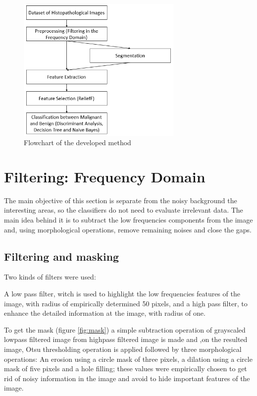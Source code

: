 \documentclass[conference]{IEEEtran}
\begin{document}
\begin{figure}[h]
    \centering
    \includegraphics[width=8cm]{images/imagem3.png}
    \caption{Flowchart of the developed method}
    \label{fig:my_label}
\end{figure}

\section{Filtering: Frequency Domain}
The main objective of this section is separate from the noisy background the interesting areas, so the classifiers do not need to evaluate irrelevant data.
The main idea behind it is to subtract the low frequencies components from the image and, using morphological operations, remove remaining noises and close the gaps.
\subsection{Filtering and masking}
	Two kinds of filters were used:
	\par A low pass filter, witch is used to highlight the low frequencies features of the image, with radius of  empirically determined 50 pixels, and a high pass filter, to enhance the detailed information at the image, with  radius of one.
	
	\par To get the mask (figure \ref{fig:mask}) a simple subtraction operation of grayscaled lowpass filtered image from highpass filtered image is made and ,on the resulted image, Otsu thresholding operation is applied followed by three morphological operations: An erosion using a circle mask of three pixels, a dilation using a circle mask of five pixels and a hole filling; these values were empirically chosen to get rid of noisy information in the image and avoid to hide important features of the image.
	
\end{document}
